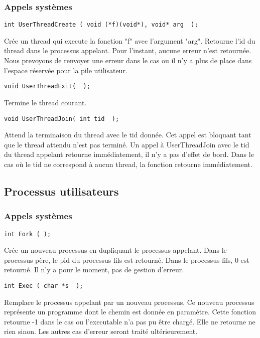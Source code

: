 \documentclass{article}
\begin{document}
\subsubsection{Appels systèmes}

\begin{verbatim}
int UserThreadCreate ( void (*f)(void*), void* arg  );
\end{verbatim}
Crée un thread qui execute la fonction "f" avec l'argument "arg". Retourne l'id du thread dans le processus appelant. Pour l'instant, aucune erreur n'est retournée. Nous prevoyons de renvoyer une erreur dans le cas ou il n'y a plus de place dans l'espace réservée pour la pile utilisateur.

\begin{verbatim}
void UserThreadExit(  );
\end{verbatim}
Termine le thread courant.

\begin{verbatim}
void UserThreadJoin( int tid  );
\end{verbatim}
Attend la terminaison du thread avec le tid donnée. Cet appel est bloquant
tant que le thread attendu n'est pas terminé.  Un appel à UserThreadJoin
avec le tid du thread appelant retourne immédiatement, il n'y a pas d'effet de bord.
Dans le cas où le tid ne correspond à aucun thread, la fonction retourne immédiatement.

\subsection{Processus utilisateurs}
\subsubsection{Appels systèmes}

\begin{verbatim}
int Fork ( );
\end{verbatim}
Crée un nouveau processus en dupliquant le processus appelant. Dans le processus père, le pid du processus fils est retourné. Dans le processus fils, 0 est retourné.
Il n'y a pour le moment, pas de gestion d'erreur.

\begin{verbatim}
int Exec ( char *s  );
\end{verbatim}
Remplace le processus appelant par un nouveau processus. Ce nouveau processus représente un programme dont le chemin est donnée en paramètre.
Cette fonction retourne -1 dans le cas ou l'executable n'a pas pu être chargé. Elle ne retourne ne rien sinon. Les autres cas d'erreur seront traité ultérieurement.
\end{document}
